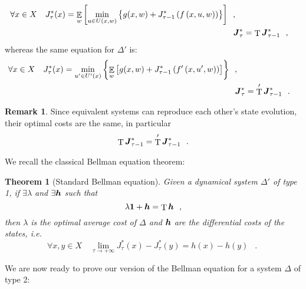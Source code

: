 \documentclass[11pt,a4paper]{article}
\DeclareMathOperator{\E}{\mathbb{E}}
\DeclareMathOperator{\T}{T}
\DeclareMathOperator{\mf}{\enspace .}
\DeclareMathOperator{\mc}{\enspace ,}
\newcommand{\tone}{}
\newcommand{\ttwo}{'}
\newtheorem{theorem}{Theorem}
\theoremstyle{definition}
\newtheorem{remark}{Remark}
\theoremstyle{remark}
\def\vec#1{\mathchoice{\mbox{\boldmath$\displaystyle#1$}}
  {\mbox{\boldmath$\textstyle#1$}}
  {\mbox{\boldmath$\scriptstyle#1$}}
  {\mbox{\boldmath$\scriptscriptstyle#1$}}}
\begin{document}
\begin{align}\label{beq1}
  \begin{split}
    \forall x\in X \quad J^*_\tau(x)&=\E_w\left[\min_{u\tone\in
        U\tone(x,w)}\left\{g(x,w)+J^*_{\tau-1}
        \left(f\tone\left(x,u\tone,w\right)\right)\right\}\right] \mc
  \end{split}\\
  \vec J^*_\tau &= \T\tone \vec J^*_{\tau-1} \mc
\end{align}
whereas the same equation for $\Delta\ttwo$ is:
\begin{align}\label{beq2}
  \begin{split}
    \forall x\in X \quad J^*_\tau(x)&=\min_{u\ttwo\in U\ttwo(x)}\left\{\E_w\left[
        g(x,w)+J^*_{\tau-1}\left(f\ttwo\left(x,u\ttwo,w\right)\right)\right]\right\} \mc
  \end{split}\\
  \vec J^*_\tau &= \T\ttwo \vec J^*_{\tau-1} \mf
\end{align}
\begin{remark}
  Since equivalent systems can reproduce each other's state evolution, their
  optimal costs are the same, in particular
  \begin{equation}
    \T\tone \vec J^*_{\tau-1}=\T\ttwo \vec J^*_{\tau-1} \mf
  \end{equation}
\end{remark}
We recall the classical Bellman equation theorem:
\begin{theorem}[Standard Bellman equation]\label{belorig}
  Given a dynamical system $\Delta\ttwo$ of type 1, if $\exists \lambda$ and
  $\exists \vec h$ such that
  \begin{equation}
    \lambda \vec 1 + \vec h = \T\tone \vec h \mc
  \end{equation}
  then $\lambda$ is the optimal average cost of $\Delta\tone$ and $\vec h$ are the
  differential costs of the states, i.e.
  \begin{equation}
    \forall x,y \in X \quad \lim_{\tau\rightarrow +\infty} J_\tau^*(x)-J_\tau^*(y)=h(x)-h(y) \mf
  \end{equation}
\end{theorem}
We are now ready to prove our version of the Bellman equation for a system
$\Delta\tone$ of type 2:
\end{document}
